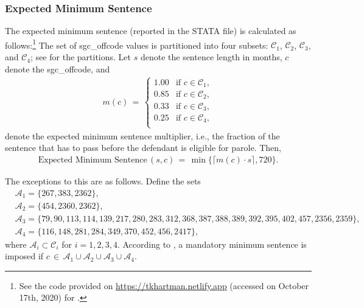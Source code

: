 \documentclass[11pt, oneside]{article}   	%
\theoremstyle{ModifiedStyle}
\begin{document}
    \subsubsection{Expected Minimum Sentence}
      The expected minimum sentence (reported in the STATA file) is calculated as follows:\footnote{See the code provided on \url{https://tkhartman.netlify.app} (accessed on October 17th, 2020) for \cite{hester2017conditional}.} The set of sgc\_offcode values is partitioned into four subsets: $\mathcal{C}_1$, $\mathcal{C}_2$, $\mathcal{C}_3$, and $\mathcal{C}_4$; see \cite{hester2017conditional} for the partitions. Let $s$ denote the sentence length in months, $c$ denote the sgc\_offcode, and
        \begin{align*}
          m(c) \,=\, \left \{\!\! \begin{array}{ll}
          1.00 & \text{if } c \in \mathcal{C}_1, \\
          0.85 & \text{if } c \in \mathcal{C}_2, \\
          0.33 & \text{if } c \in \mathcal{C}_3, \\
          0.25 & \text{if } c \in \mathcal{C}_4, \\
          \end{array} \right.
        \end{align*}
        denote the expected minimum sentence multiplier, i.e., the fraction of the sentence that has to pass before the defendant is eligible for parole. Then,
        \begin{align}
          \text{Expected Minimum Sentence}\,(s,c) \,=\, \min \big\{ \big\lceil m(c) \cdot s \big\rceil ,720 \big\}.
          \label{Equation_Expected_Minimum_Sentence}
        \end{align}

        The exceptions to this are as follows. Define the sets
        \begin{align*}
          &\mathcal{A}_1 = \{267, 383, 2362\},\\
          &\mathcal{A}_2 = \{454, 2360, 2362\},\\
          &\mathcal{A}_3 = \{79, 90, 113, 114, 139, 217, 280, 283, 312, 368, 387, 388, 389, 392, 395, 402, 457, 2356, 2359\}, \\ &\mathcal{A}_4 = \{116, 148, 281, 284, 349, 370, 452, 456, 2417\},
        \end{align*}
        where $\mathcal{A}_i \subset \mathcal{C}_i$ for $i=1,2,3,4$. According to \cite{hester2017conditional}, a mandatory minimum sentence is imposed if $c \,\in\, \mathcal{A}_1 \cup \mathcal{A}_2 \cup \mathcal{A}_3 \cup \mathcal{A}_4$.
\end{document}

